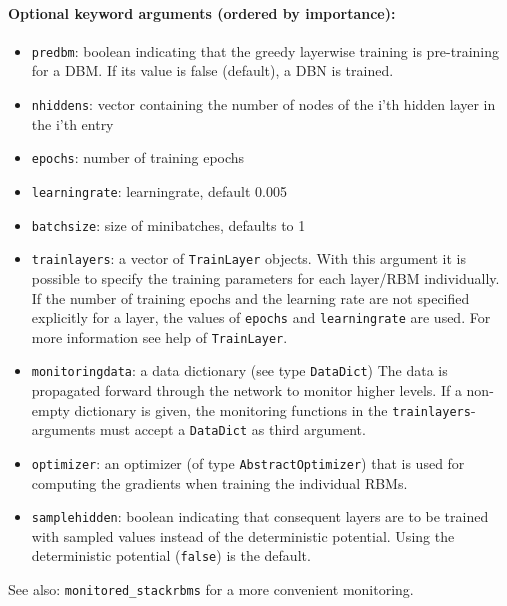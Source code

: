 \paragraph*{Optional keyword arguments (ordered by importance):}
\begin{itemize}
\item \texttt{predbm}: boolean indicating that the greedy layerwise training is  pre-training for a DBM.  If its value is false (default), a DBN is trained.


\item \texttt{nhiddens}: vector containing the number of nodes of the i'th hidden layer in  the i'th entry


\item \texttt{epochs}: number of training epochs


\item \texttt{learningrate}: learningrate, default 0.005


\item \texttt{batchsize}: size of minibatches, defaults to 1


\item \texttt{trainlayers}: a vector of \texttt{TrainLayer} objects. With this argument it is possible  to specify the training parameters for each layer/RBM individually.  If the number of training epochs and the learning rate are not specified  explicitly for a layer, the values of \texttt{epochs} and \texttt{learningrate} are used.  For more information see help of \texttt{TrainLayer}.


\item \texttt{monitoringdata}: a data dictionary (see type \texttt{DataDict})  The data is propagated forward through the  network to monitor higher levels.  If a non-empty dictionary is given, the monitoring functions in the  \texttt{trainlayers}-arguments must accept a \texttt{DataDict} as third argument.


\item \texttt{optimizer}: an optimizer (of type \texttt{AbstractOptimizer}) that is used for  computing the gradients when training the individual RBMs.


\item \texttt{samplehidden}: boolean indicating that consequent layers are to be trained  with sampled values instead of the deterministic potential.  Using the deterministic potential (\texttt{false}) is the default.

\end{itemize}
See also: \texttt{monitored\_stackrbms} for a more convenient monitoring.

